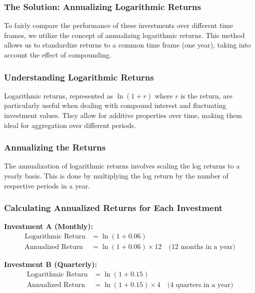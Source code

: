\documentclass{article}
\begin{document}
\subsubsection{The Solution: Annualizing Logarithmic Returns}

To fairly compare the performance of these investments over different time frames, we utilize the concept of annualizing logarithmic returns. This method allows us to standardize returns to a common time frame (one year), taking into account the effect of compounding.

\subsubsection*{Understanding Logarithmic Returns}

Logarithmic returns, represented as $\ln(1 + r)$ where $r$ is the return, are particularly useful when dealing with compound interest and fluctuating investment values. They allow for additive properties over time, making them ideal for aggregation over different periods.

\subsubsection*{Annualizing the Returns}

The annualization of logarithmic returns involves scaling the log returns to a yearly basis. This is done by multiplying the log return by the number of respective periods in a year.

\subsubsection*{Calculating Annualized Returns for Each Investment}

\textbf{Investment A (Monthly):}
\begin{align*}
    \text{Logarithmic Return} &= \ln(1 + 0.06) \\
    \text{Annualized Return} &= \ln(1 + 0.06) \times 12 \quad \text{(12 months in a year)}
\end{align*}

\textbf{Investment B (Quarterly):}
\begin{align*}
    \text{Logarithmic Return} &= \ln(1 + 0.15) \\
    \text{Annualized Return} &= \ln(1 + 0.15) \times 4 \quad \text{(4 quarters in a year)}
\end{align*}
\end{document}
